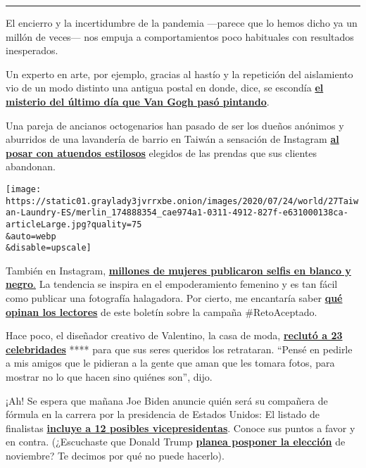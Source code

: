 \begin{center}\rule{0.5\linewidth}{\linethickness}\end{center}

El encierro y la incertidumbre de la pandemia ---parece que lo hemos
dicho ya un millón de veces--- nos empuja a comportamientos poco
habituales con resultados inesperados.

Un experto en arte, por ejemplo, gracias al hastío y la repetición del
aislamiento vio de un modo distinto una antigua postal en donde, dice,
se escondía
\textbf{\href{https://www.nytimes3xbfgragh.onion/es/2020/07/29/espanol/cultura/vincent-van-gogh-raices-arbol.html}{el
misterio del último día que Van Gogh pasó pintando}}.

Una pareja de ancianos octogenarios han pasado de ser los dueños
anónimos y aburridos de una lavandería de barrio en Taiwán a sensación
de Instagram
\textbf{\href{https://www.nytimes3xbfgragh.onion/es/2020/07/28/espanol/mundo/lavanderia-taiwanesa-instagram.html}{al
posar con atuendos estilosos}} elegidos de las prendas que sus clientes
abandonan.

\texttt{[image: https://static01.graylady3jvrrxbe.onion/images/2020/07/24/world/27Taiwan-Laundry-ES/merlin\_174888354\_cae974a1-0311-4912-827f-e631000138ca-articleLarge.jpg?quality=75\\\&auto=webp\\\&disable=upscale]}

También en Instagram,
\textbf{\href{https://www.nytimes3xbfgragh.onion/es/2020/07/28/espanol/estilos-de-vida/reto-selfi-blanco-negro.html}{millones
de mujeres publicaron selfis en blanco y
negro}}\href{https://www.nytimes3xbfgragh.onion/es/2020/07/28/espanol/estilos-de-vida/reto-selfi-blanco-negro.html}{.}
La tendencia se inspira en el empoderamiento femenino y es tan fácil
como publicar una fotografía halagadora. Por cierto, me encantaría saber
\textbf{\href{https://www.nytimes3xbfgragh.onion/es/2020/07/28/espanol/estilos-de-vida/reto-selfi-blanco-negro.html\#commentsContainer}{qué
opinan los lectores}} de este boletín sobre la campaña \#RetoAceptado.

Hace poco, el diseñador creativo de Valentino, la casa de moda,
\textbf{\href{https://www.nytimes3xbfgragh.onion/es/2020/07/25/espanol/estilos-de-vida/gwyneth-paltrow-valentino.html}{reclutó
a 23 celebridades}} **** para que sus seres queridos los retrataran.
``Pensé en pedirle a mis amigos que le pidieran a la gente que aman que
les tomara fotos, para mostrar no lo que hacen sino quiénes son'', dijo.

¡Ah! Se espera que mañana Joe Biden anuncie quién será su compañera de
fórmula en la carrera por la presidencia de Estados Unidos: El listado
de finalistas
\textbf{\href{https://www.nytimes3xbfgragh.onion/es/2020/07/29/espanol/estados-unidos/biden-vicepresidente.html}{incluye
a 12 posibles vicepresidentas}}. Conoce sus puntos a favor y en contra.
(¿Escuchaste que Donald Trump
\textbf{\href{https://www.nytimes3xbfgragh.onion/es/2020/07/30/espanol/estados-unidos/trump-retrasar-elecciones.html}{planea
posponer la elección}} de noviembre? Te decimos por qué no puede
hacerlo).

